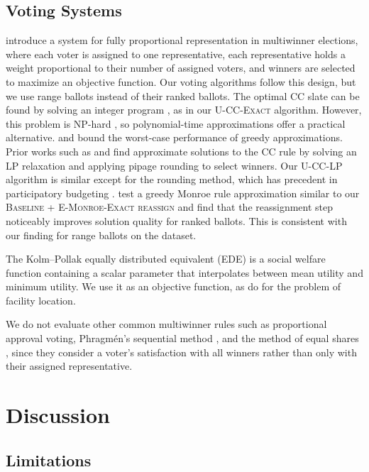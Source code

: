 \documentclass[letterpaper]{article} %
\newcommand{\Exact}{\textsc{U-CC-Exact}}
\newcommand{\LP}{\textsc{U-CC-LP}}
\newcommand{\BaselineEMonroeReassign}{\textsc{Baseline + E-Monroe-Exact reassign}}
\begin{document}
\subsection{Voting Systems}
\citet{chamberlin-courant} introduce a system for fully proportional representation in multiwinner elections, where each voter is assigned to one representative, each representative holds a weight proportional to their number of assigned voters, and winners are selected to maximize an objective function.
Our voting algorithms follow this design, but we use range ballots instead of their ranked ballots.
The optimal CC slate can be found by solving an integer program \citep{potthoff-brams-1998}, as in our \Exact{} algorithm.
However, this problem is NP-hard \citep{procaccia-2008, lu-boutilier-2011}, so polynomial-time approximations offer a practical alternative.
\citet{nemhauser-1978} and \citet{lu-boutilier-2011} bound the worst-case performance of greedy approximations.
Prior works such as \citet{ageev-sviridenko-2004} and \citet{calinescu-2007} find approximate solutions to the CC rule by solving an LP relaxation and applying pipage rounding to select winners.
Our \LP{} algorithm is similar except for the rounding method, which has precedent in participatory budgeting \citep{sreedurga-2022}.
\citet{skowron-2015} test a greedy Monroe rule approximation similar to our \BaselineEMonroeReassign{} and find that the reassignment step noticeably improves solution quality for ranked ballots.
This is consistent with our finding for range ballots on the \citet{fish-v2} dataset.

The Kolm--Pollak equally distributed equivalent (EDE) \citep{kolm-1976, pollak-1971} is a social welfare function containing a scalar parameter that interpolates between mean utility and minimum utility. We use it as an objective function, as \citet{horton-2025} do for the problem of facility location.

We do not evaluate other common multiwinner rules such as proportional approval voting, Phragm\'{e}n's sequential method \citep{janson_phragmens_2016}, and the method of equal shares \citep{peters_proportional_2022}, since they consider a voter's satisfaction with all winners rather than only with their assigned representative.

\section{Discussion}

\subsection{Limitations} \label{sec:limitations}
\end{document}
